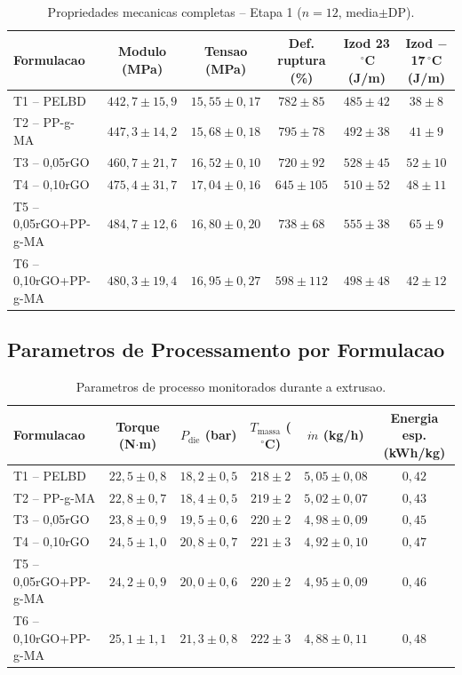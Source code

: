 \documentclass[11pt,a4paper,oneside]{article}
\begin{document}
\begin{table}[H]\centering
\caption{Propriedades mecanicas completas -- Etapa 1 ($n{=}12$, media$\pm$DP).}\label{tab:sup1}
\begin{tabular}{lccccc}
\toprule
{\bfseries Formulacao} & {\bfseries Modulo (MPa)} & {\bfseries Tensao (MPa)} & {\bfseries Def. ruptura (\%)} & {\bfseries Izod 23$\,^{\circ}$C (J/m)} & {\bfseries Izod $-$17$\,^{\circ}$C (J/m)} \\
\midrule
T1 -- PELBD           & $442{,}7{\pm}15{,}9$ & $15{,}55{\pm}0{,}17$ & $782{\pm}85$  & $485{\pm}42$ & $38{\pm}8$ \\
T2 -- PP-g-MA         & $447{,}3{\pm}14{,}2$ & $15{,}68{\pm}0{,}18$ & $795{\pm}78$  & $492{\pm}38$ & $41{\pm}9$ \\
T3 -- 0,05rGO         & $460{,}7{\pm}21{,}7$ & $16{,}52{\pm}0{,}10$ & $720{\pm}92$  & $528{\pm}45$ & $52{\pm}10$ \\
T4 -- 0,10rGO         & $475{,}4{\pm}31{,}7$ & $17{,}04{\pm}0{,}16$ & $645{\pm}105$ & $510{\pm}52$ & $48{\pm}11$ \\
T5 -- 0,05rGO+PP-g-MA & $484{,}7{\pm}12{,}6$ & $16{,}80{\pm}0{,}20$ & $738{\pm}68$  & $555{\pm}38$ & $65{\pm}9$ \\
T6 -- 0,10rGO+PP-g-MA & $480{,}3{\pm}19{,}4$ & $16{,}95{\pm}0{,}27$ & $598{\pm}112$ & $498{\pm}48$ & $42{\pm}12$ \\
\bottomrule
\end{tabular}
\end{table}

\subsection{Parametros de Processamento por Formulacao}

\begin{table}[H]\centering
\caption{Parametros de processo monitorados durante a extrusao.}\label{tab:sup2}
\begin{tabular}{lccccc}
\toprule
{\bfseries Formulacao} & {\bfseries Torque (N$\cdot$m)} & {\bfseries $P_{\text{die}}$ (bar)} & {\bfseries $T_{\text{massa}}$ ($^{\circ}$C)} & {\bfseries $\dot{m}$ (kg/h)} & {\bfseries Energia esp. (kWh/kg)} \\
\midrule
T1 -- PELBD           & $22{,}5{\pm}0{,}8$  & $18{,}2{\pm}0{,}5$ & $218{\pm}2$ & $5{,}05{\pm}0{,}08$ & $0{,}42$ \\
T2 -- PP-g-MA         & $22{,}8{\pm}0{,}7$  & $18{,}4{\pm}0{,}5$ & $219{\pm}2$ & $5{,}02{\pm}0{,}07$ & $0{,}43$ \\
T3 -- 0,05rGO         & $23{,}8{\pm}0{,}9$  & $19{,}5{\pm}0{,}6$ & $220{\pm}2$ & $4{,}98{\pm}0{,}09$ & $0{,}45$ \\
T4 -- 0,10rGO         & $24{,}5{\pm}1{,}0$  & $20{,}8{\pm}0{,}7$ & $221{\pm}3$ & $4{,}92{\pm}0{,}10$ & $0{,}47$ \\
T5 -- 0,05rGO+PP-g-MA & $24{,}2{\pm}0{,}9$  & $20{,}0{\pm}0{,}6$ & $220{\pm}2$ & $4{,}95{\pm}0{,}09$ & $0{,}46$ \\
T6 -- 0,10rGO+PP-g-MA & $25{,}1{\pm}1{,}1$  & $21{,}3{\pm}0{,}8$ & $222{\pm}3$ & $4{,}88{\pm}0{,}11$ & $0{,}48$ \\
\bottomrule
\end{tabular}
\end{table}
\end{document}
